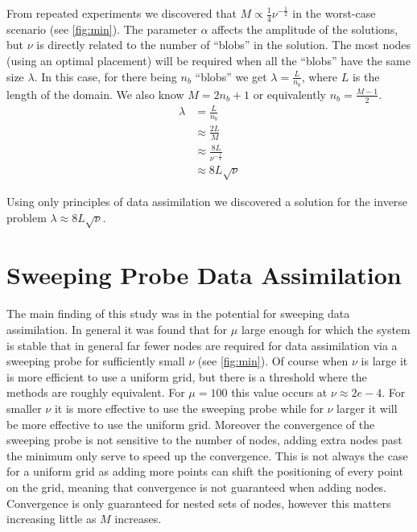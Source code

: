 \documentclass[12pt]{amsart}
\theoremstyle{plain}
\theoremstyle{definition}
\theoremstyle{remark}
\numberwithin{equation}{section} %
\numberwithin{figure}{section}   %
\begin{document}
From repeated experiments we discovered that $M \propto \frac{1}{4}\nu^{-\frac{1}{2}}$ in the worst-case scenario (see \ref{fig:min}). The parameter $\alpha$ affects the amplitude of the solutions, but $\nu$ is directly related to the number of ``blobs'' in the solution. The most nodes (using an optimal placement) will be required when all the ``blobs'' have the same size $\lambda$. In this case, for there being $n_b$ ``blobs'' we get $\lambda = \frac{L}{n_b} $, where $L$ is the length of the domain. We also know $M = 2n_b + 1$ or equivalently $n_b = \frac{M-1}{2}$.
\begin{align*}
\lambda & = \frac{L}{n_b}\\
&\approx\frac{2L}{M}\\
&\approx\frac{8L}{\nu^{-\frac{1}{2}}}\\
& \approx 8L\sqrt{\nu}
\end{align*}

Using only principles of data assimilation we discovered a solution for the inverse problem $\lambda \approx 8L\sqrt{\nu}$.
 \section{Sweeping Probe Data Assimilation}\label{secNeatSection}
\noindent
The main finding of this study was in the potential for sweeping data assimilation. In general it was found that for $\mu$ large enough for which the system is stable that in general far fewer nodes are required for data assimilation via a sweeping probe for sufficiently small $\nu$ (see \cref{fig:min}). Of course when $\nu$ is large it is more efficient to use a uniform grid, but there is a threshold where the methods are roughly equivalent. For $\mu =100$ this value occurs at $\nu \approx 2e-4$. For smaller $\nu$ it is more effective to use the sweeping probe while for $\nu$ larger it will be more effective to use the uniform grid. Moreover the convergence of the sweeping probe is not sensitive to the number of nodes, adding extra nodes past the minimum only serve to speed up the convergence. This is not always the case for a uniform grid as adding more points can shift the positioning of every point on the grid, meaning that convergence is not guaranteed when adding nodes. Convergence is only guaranteed for nested sets of nodes, however this matters increasing little as $M$ increases.
\end{document}
